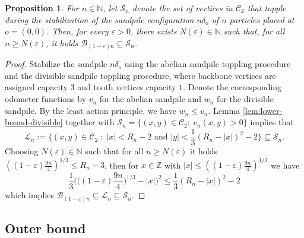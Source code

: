 \documentclass[11pt]{article}
\newtheorem{proposition}{Proposition}[section]
\newcommand{\N}{\mathbb{N}}
\newcommand{\Z}{\mathbb{Z}}
\begin{document}
\begin{proposition}\label{prop:inner-bound}
 For $n\in\mathbb{N}$,  let $\mathcal{S}_n $ denote the set of vertices in $\mathcal{C}_2$ that topple during the stabilization of the sandpile configuration $n\delta_o$  of $n$ particles placed at $o=(0,0)$. Then, for every \(\varepsilon>0\), there exists \(N(\varepsilon)\in\mathbb{N}\) such that, for all \(n\ge N(\varepsilon)\), it holds
   $ \mathcal{B}_{(1-\varepsilon)n}\subseteq \mathcal{S}_n$.
\end{proposition}
\begin{proof}
Stabilize the sandpile $n\delta_o$ using the abelian sandpile toppling procedure and the divisible sandpile toppling procedure, where backbone vertices are assigned capacity $3$ and tooth vertices capacity $1$. Denote the corresponding odometer functions by $v_n$ for the abelian sandpile and $w_n$ for the divisible sandpile. By the least action principle, we have $w_n\leq v_n$. Lemma \ref{lem:lower-bound-divisible}  together with $\mathcal{S}_n=\{(x,y)\in\mathcal{C}_2:\ v_n(x,y)>0\}$ implies that
    $$\mathcal{L}_n:=\Big\{(x,y)\in\mathcal{C}_2\;:\; |x|< R_n-2\text{ and }|y|< \frac{1}{3}(R_n-|x|)^2-2\Big\}\subseteq\mathcal{S}_n.$$
    Choosing $N(\varepsilon)\in\N$ such that for all $n\geq N(\varepsilon)$ it holds $\left((1-\varepsilon)\frac{9n}{4}\right)^{1/3}\leq R_n-3$, then for $x\in\Z$ with $|x|\leq \left((1-\varepsilon)\frac{9n}{4}\right)^{1/3}$ we have
    \[
    \frac{1}{3}\Big(\Big((1-\varepsilon)\frac{9n}{4}\Big)^{1/3}-|x|\Big)^2\leq \frac{1}{3}(R_n-|x|)^2-2
    \]
    which implies $\mathcal{B}_{(1-\varepsilon)n}\subseteq \mathcal{L}_n\subseteq \mathcal{S}_n.$ 
\end{proof}

\subsection{Outer bound}
\end{document}
